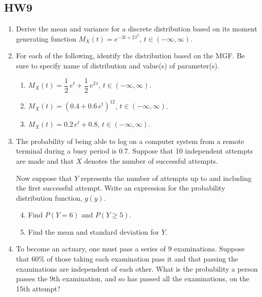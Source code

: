 \documentclass[12pt]{article}
\begin{document}
\subsection*{HW9}

\begin{enumerate}
  \item Derive the mean and variance for a discrete distribution based on its moment generating function $M_X(t) = e^{-3t + 2\,t^2}$, $t \in (-\infty, \infty)$.

\newpage

  \item For each of the following, identify the distribution based on the MGF. Be sure to specify name of distribution and value(s) of parameter(s).
    \begin{enumerate}[label=(\alph*)]
      \item $M_X(t) = \dfrac{1}{2}\,e^{t} + \dfrac{1}{2}\,e^{2\,t}$, $t \in (-\infty, \infty)$.
      \item $M_X(t) = (0.4 + 0.6\,e^{t})^{12}$, $t \in (-\infty, \infty)$.
      \item $M_X(t) = 0.2\,e^{t} + 0.8$, $t \in (-\infty, \infty)$.
    \end{enumerate}

\newpage

  \item The probability of being able to log on a computer system from a remote terminal during a busy period is 0.7. Suppose that 10 independent attempts are made and that $X$ denotes the number of successful attempts.

    Now suppose that $Y$ represents the number of attempts up to and including the first successful attempt. Write an expression for the probability distribution function, $g(y)$.
    \begin{enumerate}[label=(\alph*)]
      \setcounter{enumii}{3}
      \item Find $P(Y = 6)$ and $P(Y \ge 5)$.
      \item Find the mean and standard deviation for $Y$.
    \end{enumerate}

\newpage

  \item To become an actuary, one must pass a series of 9 examinations. Suppose that 60\% of those taking each examination pass it and that passing the examinations are independent of each other. What is the probability a person passes the 9th examination, and so has passed all the examinations, on the 15th attempt?

\end{enumerate}
\end{document}
